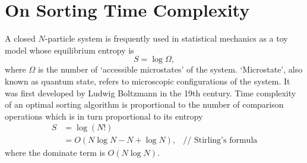 
\chapter{On Sorting Time Complexity}\label{ch:timeComplexityOfSorting}

A closed $N$-particle system is frequently used in statistical mechanics as a toy model
whose equilibrium entropy is \[S = \log \Omega,\] where $\Omega$ is the
number of `accessible microstates' of the system\cite{kittel1980thermal}.
`Microstate', also known as quantum state, refers to microscopic configurations of the system.
It was first developed by Ludwig Boltzmann in the 19th century.
Time complexity of an optimal sorting algorithm is proportional to the number of comparison
operations which is in turn proportional to its entropy
\begin{align*}
    S &= \log\left( N! \right) & \\
    &= O(N\log N-N + \log N), & \text{// Stirling's formula}
\end{align*}
where the dominate term is $O(N\log N)$.
